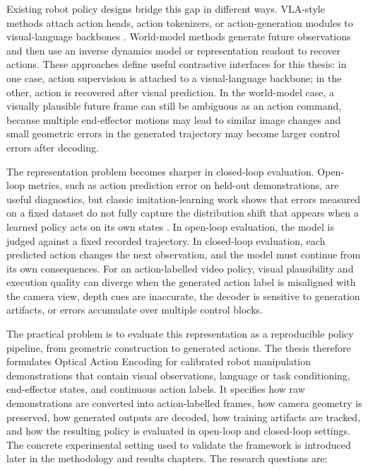 Existing robot policy designs bridge this gap in different ways. VLA-style methods attach action heads, action tokenizers, or action-generation modules to visual-language backbones \parencite{brohan2023rt2,kim2024openvla,black2024pi0,black2025pi05}. World-model methods generate future observations and then use an inverse dynamics model or representation readout to recover actions. These approaches define useful contrastive interfaces for this thesis: in one case, action supervision is attached to a visual-language backbone; in the other, action is recovered after visual prediction. In the world-model case, a visually plausible future frame can still be ambiguous as an action command, because multiple end-effector motions may lead to similar image changes and small geometric errors in the generated trajectory may become larger control errors after decoding.

The representation problem becomes sharper in closed-loop evaluation. Open-loop metrics, such as action prediction error on held-out demonstrations, are useful diagnostics, but classic imitation-learning work shows that errors measured on a fixed dataset do not fully capture the distribution shift that appears when a learned policy acts on its own states \parencite{ross2011reduction}. In open-loop evaluation, the model is judged against a fixed recorded trajectory. In closed-loop evaluation, each predicted action changes the next observation, and the model must continue from its own consequences. For an action-labelled video policy, visual plausibility and execution quality can diverge when the generated action label is misaligned with the camera view, depth cues are inaccurate, the decoder is sensitive to generation artifacts, or errors accumulate over multiple control blocks.

The practical problem is to evaluate this representation as a reproducible policy pipeline, from geometric construction to generated actions. The thesis therefore formulates Optical Action Encoding for calibrated robot manipulation demonstrations that contain visual observations, language or task conditioning, end-effector states, and continuous action labels. It specifies how raw demonstrations are converted into action-labelled frames, how camera geometry is preserved, how generated outputs are decoded, how training artifacts are tracked, and how the resulting policy is evaluated in open-loop and closed-loop settings. The concrete experimental setting used to validate the framework is introduced later in the methodology and results chapters. The research questions are:

